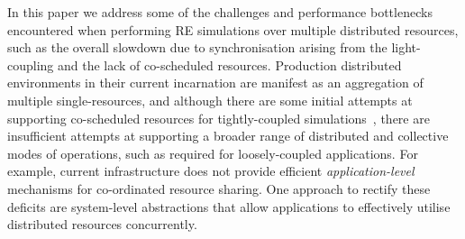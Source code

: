 \documentclass{rspublic}
\newcommand{\alnote}[1]{ {\textcolor{blue} { ***AL: #1 }}}
\newcommand{\jhanote}[1]{ {\textcolor{red} { ***SJ: #1 }}}
\newcommand{\alnote}[1]{}
\newcommand{\jhanote}[1]{}
\begin{document}
In this paper we address
some of the challenges and performance bottlenecks encountered when
performing RE simulations over multiple distributed resources,
such as the overall slowdown due to synchronisation arising from the
light-coupling and the lack of co-scheduled resources. Production
distributed environments in their current incarnation are manifest as
an aggregation of multiple single-resources, and although there are some
initial attempts at supporting co-scheduled resources for
tightly-coupled simulations~\citep{repex_mpig}, there are insufficient
attempts at supporting a broader range of distributed and collective
modes of operations, such as required for loosely-coupled
applications.  For example, current infrastructure does not provide
efficient {\it ap\-pli\-cation-level} mechanisms for co-ordinated resource
sharing. One approach to rectify these deficits are system-level
abstractions that allow applications to effectively utilise
distributed resources concurrently.

\end{document}
